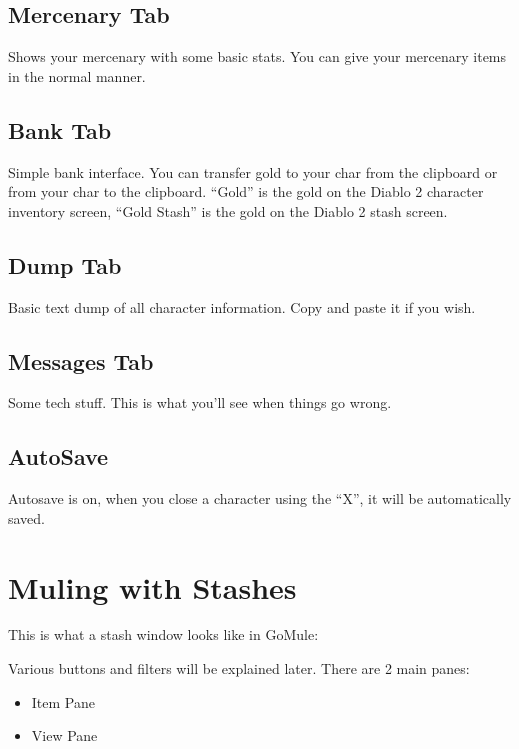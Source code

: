 \documentclass[a4paper,10pt]{article}
\begin{document}
\subsection{Mercenary Tab}

Shows your mercenary with some basic stats. You can give your mercenary items in the normal manner.

\subsection{Bank Tab}

Simple bank interface. You can transfer gold to your char from the clipboard or from your char to the clipboard. ``Gold'' is the gold on the Diablo 2 character inventory screen, ``Gold Stash'' is the gold on the Diablo 2 stash screen.

\subsection{Dump Tab}

Basic text dump of all character information. Copy and paste it if you wish.

\subsection{Messages Tab}

Some tech stuff. This is what you'll see when things go wrong.

\subsection{AutoSave}

Autosave is on, when you close a character using the ``X'', it will be automatically saved.

\section{Muling with Stashes}

This is what a stash window looks like in GoMule:

\begin{figure}[htp]
\centering
{}
\end{figure}

Various buttons and filters will be explained later. There are 2 main panes:

\begin{itemize}
 \item Item Pane
 \item View Pane
\end{itemize}
\end{document}
